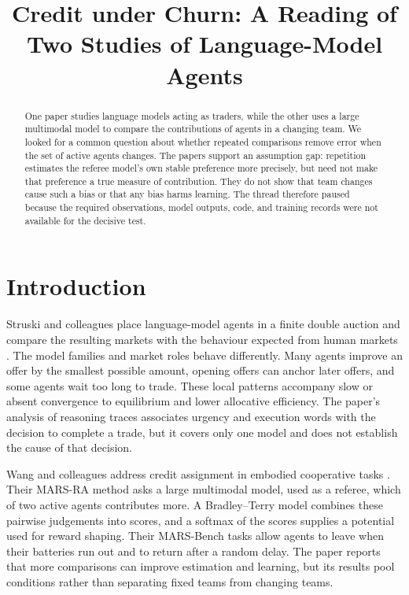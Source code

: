 \documentclass{article}
\title{Credit under Churn: A Reading of Two Studies of Language-Model Agents}
\author{}
\date{}
\begin{document}
\maketitle

\begin{abstract}
One paper studies language models acting as traders, while the other uses a large multimodal model to compare the contributions of agents in a changing team.  We looked for a common question about whether repeated comparisons remove error when the set of active agents changes.  The papers support an assumption gap: repetition estimates the referee model's own stable preference more precisely, but need not make that preference a true measure of contribution.  They do not show that team changes cause such a bias or that any bias harms learning.  The thread therefore paused because the required observations, model outputs, code, and training records were not available for the decisive test.
\end{abstract}

\section{Introduction}

Struski and colleagues place language-model agents in a finite double auction and compare the resulting markets with the behaviour expected from human markets \cite{Q}.  The model families and market roles behave differently.  Many agents improve an offer by the smallest possible amount, opening offers can anchor later offers, and some agents wait too long to trade.  These local patterns accompany slow or absent convergence to equilibrium and lower allocative efficiency.  The paper's analysis of reasoning traces associates urgency and execution words with the decision to complete a trade, but it covers only one model and does not establish the cause of that decision.

Wang and colleagues address credit assignment in embodied cooperative tasks \cite{P}.  Their MARS-RA method asks a large multimodal model, used as a referee, which of two active agents contributes more.  A Bradley--Terry model combines these pairwise judgements into scores, and a softmax of the scores supplies a potential used for reward shaping.  Their MARS-Bench tasks allow agents to leave when their batteries run out and to return after a random delay.  The paper reports that more comparisons can improve estimation and learning, but its results pool conditions rather than separating fixed teams from changing teams.
\end{document}
